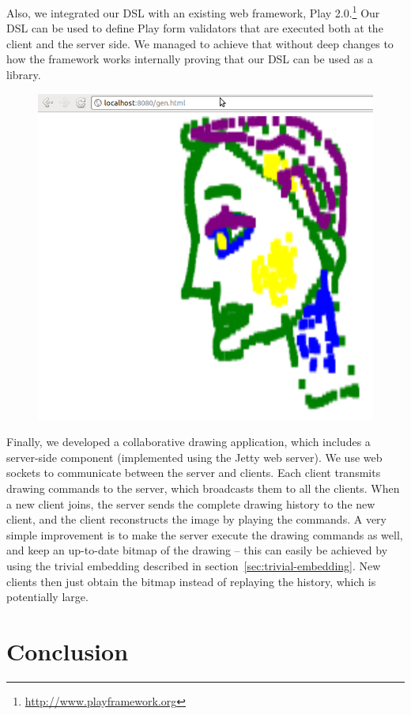 \documentclass[runningheads,a4paper]{llncs}
\begin{document}
Also, we integrated our DSL with an existing web framework, Play 2.0.\footnote{\url{http://www.playframework.org}}
Our DSL can be used to define Play form validators that are executed both at the client and the server side.
We managed to achieve that without deep changes to how the framework works internally proving that our
DSL can be used as a library.

\begin{figure}
\includegraphics[scale=0.2]{drawing}
\end{figure}
Finally, we developed a collaborative drawing application, which
includes a server-side component (implemented using the Jetty web
server). We use web sockets to communicate between the server and
clients. Each client transmits drawing commands to the server, which
broadcasts them to all the clients. When a new client joins, the
server sends the complete drawing history to the new client, and the
client reconstructs the image by playing the commands. A very
simple improvement is to make the server execute the drawing
commands as well, and keep an up-to-date bitmap of the drawing -- this
can easily be achieved by using the trivial embedding described in
section~\ref{sec:trivial-embedding}. New clients then just obtain the
bitmap instead of replaying the history, which is potentially large.

\section{Conclusion}\label{sec:conclusion}
\end{document}
